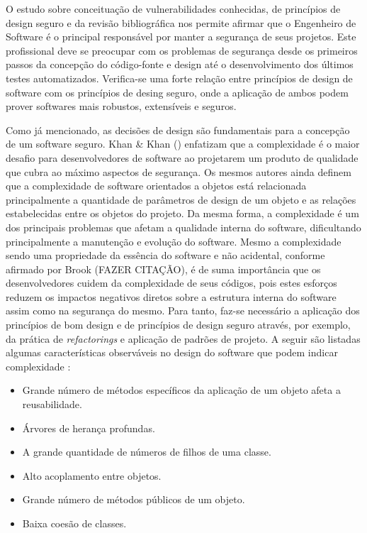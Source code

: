 %

O estudo sobre conceituação de vulnerabilidades conhecidas, de princípios de design seguro e da revisão bibliográfica nos permite afirmar que o Engenheiro de Software é o principal responsável por manter a segurança de seus projetos. Este profissional deve se preocupar com os problemas de segurança desde os primeiros passos da concepção do código-fonte e design até o desenvolvimento dos últimos testes automatizados. Verifica-se uma forte relação entre princípios de design de software com os princípios de desing seguro, onde a aplicação de ambos podem prover softwares mais robustos, extensíveis e seguros. 

%

Como já mencionado, as decisões de design são fundamentais para a concepção de um software seguro. Khan \& Khan (\citeyear{khan2010}) enfatizam que a complexidade é o maior desafio para desenvolvedores de software ao projetarem um produto de qualidade que cubra ao máximo aspectos de segurança. Os mesmos autores ainda definem que a complexidade de software orientados a objetos está relacionada principalmente a quantidade de parâmetros de design de um objeto e as relações estabelecidas entre os objetos do projeto. Da mesma forma, a complexidade é um dos principais problemas que afetam a qualidade interna do software, dificultando principalmente a manutenção e evolução do software. Mesmo a complexidade sendo uma propriedade da essência do software e não acidental, conforme afirmado por Brook (FAZER CITAÇÃO), é de suma importância que os desenvolvedores cuidem da complexidade de seus códigos, pois estes esforços reduzem os impactos negativos diretos sobre a estrutura interna do software assim como na segurança do mesmo. Para tanto, faz-se necessário a aplicação dos princípios de bom design e de princípios de design seguro através, por exemplo, da prática de \emph{refactorings} e aplicação de padrões de projeto. A seguir são listadas algumas características observáveis no design do software que podem indicar complexidade \cite{khan2010}:

%

\begin{itemize}
\item Grande número de métodos específicos da aplicação de um objeto afeta a reusabilidade.
\item Árvores de herança profundas.
\item A grande quantidade de números de filhos de uma classe.
\item Alto acoplamento entre objetos.
\item Grande número de métodos públicos de um objeto.
\item Baixa coesão de classes. 
\end{itemize}

